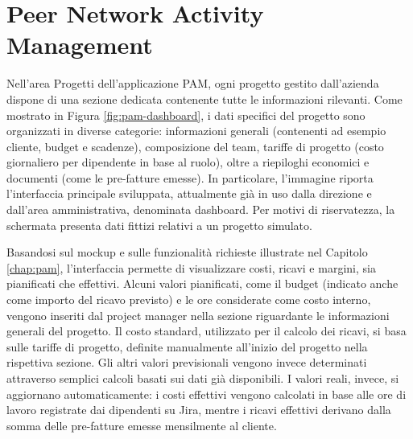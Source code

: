 \section{Peer Network Activity Management}
Nell'area Progetti dell’applicazione \ac{PAM}, ogni progetto gestito dall’azienda dispone di una sezione dedicata
contenente tutte le informazioni rilevanti.
Come mostrato in Figura \ref{fig:pam-dashboard}, i dati specifici del progetto sono organizzati in diverse categorie:
informazioni generali (contenenti ad esempio cliente, budget e scadenze), composizione del team, tariffe di progetto
(costo giornaliero per dipendente in base al ruolo), oltre a riepiloghi economici e documenti (come le pre-fatture emesse).
In particolare, l'immagine riporta l'interfaccia principale sviluppata, attualmente già in uso dalla direzione e
dall'area amministrativa, denominata dashboard. Per motivi di riservatezza, la schermata presenta dati fittizi relativi
a un progetto simulato.

Basandosi sul mockup e sulle funzionalità richieste illustrate nel Capitolo \ref{chap:pam}, l’interfaccia permette
di visualizzare costi, ricavi e margini, sia pianificati che effettivi.
Alcuni valori pianificati, come il budget (indicato anche come importo del ricavo previsto) e le ore considerate
come costo interno, vengono inseriti dal project manager nella sezione riguardante le informazioni generali
del progetto.
Il costo standard, utilizzato per il calcolo dei ricavi, si basa sulle tariffe di progetto, definite manualmente all’inizio del
progetto nella rispettiva sezione.
Gli altri valori previsionali vengono invece determinati attraverso semplici calcoli basati sui dati già disponibili.
I valori reali, invece, si aggiornano automaticamente: i costi effettivi vengono calcolati in base alle ore di lavoro
registrate dai dipendenti su Jira, mentre i ricavi effettivi derivano dalla somma delle pre-fatture emesse mensilmente al cliente.